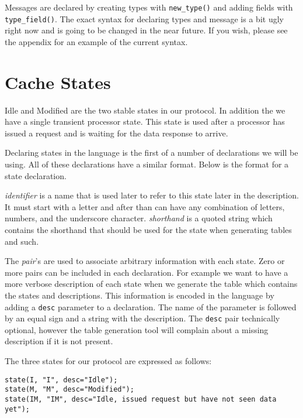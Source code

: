 \documentclass[11pt]{article}
\begin{document}
Messages are declared by creating types with {\tt new\_type()} and
adding fields with {\tt type\_field()}.  The exact syntax for
declaring types and message is a bit ugly right now and is going to be
changed in the near future.  If you wish, please see the appendix for
an example of the current syntax.



\section*{Cache States}

Idle and Modified are the two stable states in our protocol.  In
addition the we have a single transient processor state.  This state
is used after a processor has issued a request and is waiting for the
data response to arrive.

Declaring states in the language is the first of a number of
declarations we will be using.  All of these declarations have a
similar format.  Below is the format for a state declaration.


{\em identifier} is a name that is used later to
refer to this state later in the description.  It must start with a
letter and after than can have any combination of letters, numbers,
and the underscore character.  {\em shorthand} is a quoted string
which contains the shorthand that should be used for the state when
generating tables and such.

The {\em pair}'s are used to associate arbitrary information with each
state.  Zero or more pairs can be included in each declaration.  For
example we want to have a more verbose description of each state when
we generate the table which contains the states and descriptions.
This information is encoded in the language by adding a {\tt desc}
parameter to a declaration.  The name of the parameter is followed by
an equal sign and a string with the description.  The {\tt desc} pair
technically optional, however the table generation tool will complain
about a missing description if it is not present.

The three states for our protocol are expressed as follows:

\begin{verbatim}
state(I, "I", desc="Idle");
state(M, "M", desc="Modified");
state(IM, "IM", desc="Idle, issued request but have not seen data yet");
\end{verbatim}
\end{document}
